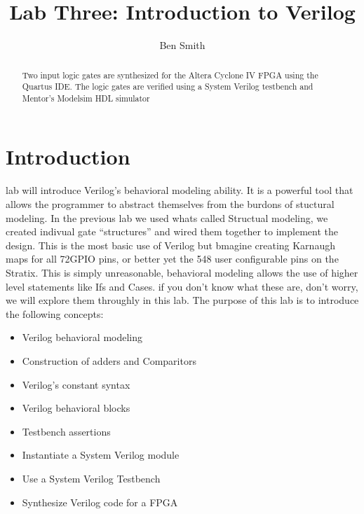 
\newcommand{\KEYWORDS}{Logic Gates, Verilog, FPGA, Signaltap, Synthesis}
\title{Lab Three: Introduction to Verilog}
\author{Ben Smith}




  \maketitle
    \begin{abstract}
      Two input logic gates are synthesized for the Altera Cyclone IV FPGA using the Quartus IDE. The logic gates are verified using a System Verilog testbench and Mentor's Modelsim HDL simulator
    \end{abstract}
  \section{\bfseries Introduction}
     lab will introduce Verilog's behavioral modeling ability. It is a powerful tool that allows the programmer to abstract themselves from the burdons of stuctural modeling. In the previous lab we used whats called Structual modeling, we created indivual gate ``structures'' and wired them together to implement the design. This is the most basic use of Verilog but bmagine creating Karnaugh maps for all 72GPIO pins, or better yet the 548 user configurable pins on the Stratix\cite{Altera:StratixDeviceOverview}. This is simply unreasonable, behavioral modeling allows the use of higher level statements like Ifs and Cases. if you don't know what these are, don't worry, we will explore them throughly in this lab. The purpose of this lab is to introduce the following concepts:
    \begin{itemize}
      \item Verilog behavioral modeling
      \item Construction of adders and Comparitors
      \item Verilog's constant syntax
      \item Verilog behavioral blocks
      \item Testbench assertions
      \item Instantiate a System Verilog module
      \item Use a System Verilog Testbench
      \item Synthesize Verilog code for a FPGA
    \end{itemize}
    
